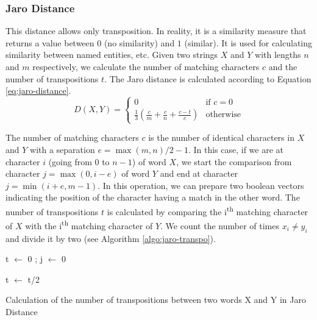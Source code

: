 \documentclass{KBook}
\begin{document}
\subsubsection{Jaro Distance}

This distance allows only transposition. In reality, it is a similarity measure that returns a value between $0$ (no similarity) and $1$ (similar). It is used for calculating similarity between named entities, etc. Given two strings $X$ and $Y$ with lengths $n$ and $m$ respectively, we calculate the number of matching characters $c$ and the number of transpositions $t$. The Jaro distance is calculated according to Equation \ref{eq:jaro-distance}.
\begin{equation}
	D(X, Y) = 
	\begin{cases}
		0 & \text{if } c = 0\\
		\frac{1}{3} (\frac{c}{m} + \frac{c}{n} + \frac{c-t}{c}) & \text{otherwise}
	\end{cases}
	\label{eq:jaro-distance}
\end{equation}

The number of matching characters $c$ is the number of identical characters in $X$ and $Y$ with a separation $ e= \max (m, n)/2 - 1$. In this case, if we are at character $i$ (going from $0$ to $n-1$) of word $X$, we start the comparison from character $j=\max(0, i - e)$ of word $Y$ and end at character $j=\min(i+e, m-1)$.
In this operation, we can prepare two boolean vectors indicating the position of the character having a match in the other word.
%
The number of transpositions $t$ is calculated by comparing the i\textsuperscript{th} matching character of $X$ with the i\textsuperscript{th} matching character of $Y$. We count the number of times $x_i \ne y_i$ and divide it by two (see Algorithm \ref{algo:jaro-transpo}).
\vspace{-6pt}
\begin{algorithm}[ht]
	t $\leftarrow$ 0 ; j $\leftarrow$ 0\;
	
	
	t $\leftarrow$ t/2\;
	
	\caption{Calculation of the number of transpositions between two words X and Y in Jaro Distance \label{algo:jaro-transpo}}
	
\end{algorithm}
\end{document}
